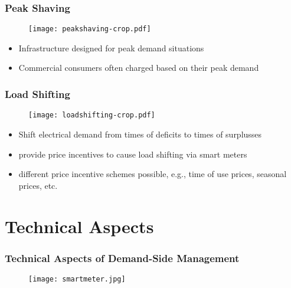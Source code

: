\documentclass[10pt,dvipsnames]{beamer}
\let\olditem\item
\renewcommand{\item}{%
\olditem\vspace{5pt}}
\begin{document}
\begin{frame}
 \frametitle{Peak Shaving}

  \begin{minipage}[t]{0.5\textwidth}
     \begin{figure}
  \texttt{[image: peakshaving-crop.pdf]}
  \end{figure}
\end{minipage}\hfill
\begin{minipage}[t]{0.5\textwidth}
\begin{itemize}
\item Infrastructure designed for peak demand situations
\item Commercial consumers often charged based on their peak demand
\end{itemize}
\end{minipage}

\end{frame}

\begin{frame}
 \frametitle{Load Shifting}

   \begin{minipage}[t]{0.5\textwidth}
     \begin{figure}
  \texttt{[image: loadshifting-crop.pdf]}
  \end{figure}
\end{minipage}\hfill
\begin{minipage}[t]{0.5\textwidth}
\begin{itemize}
\item Shift electrical demand from times of deficits to times of surplusses
\item  provide price incentives to cause load shifting via smart meters
\item different price incentive schemes possible, e.g., time of use prices, seasonal prices, etc.
\end{itemize}
\end{minipage}

\end{frame}
\section{Technical Aspects}
\begin{frame}
 \frametitle{Technical Aspects of Demand-Side Management}
   \begin{figure}
     \texttt{[image: smartmeter.jpg]}
  \end{figure}
\end{frame}
\end{document}

